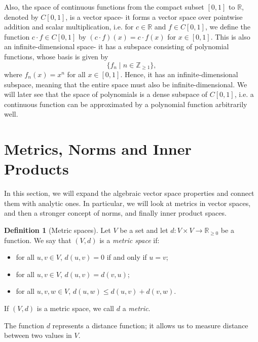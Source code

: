 \documentclass[a4paper, openany]{memoir}
\theoremstyle{definition}
\newtheorem{definition}{Definition}[section]
\theoremstyle{plain}
\begin{document}
    Also, the space of continuous functions from the compact subset $[0, 1]$ to $\mathbb{R}$, denoted by $C[0, 1]$, is a vector space- it forms a vector space over pointwise addition and scalar multiplication, i.e. for $c \in \mathbb{R}$ and $f \in C[0, 1]$, we define the function $c \cdot f \in C[0, 1]$ by $(c \cdot f)(x) = c \cdot f(x)$    for $x \in [0, 1]$. This is also an infinite-dimensional space- it has a subspace consisting of polynomial functions, whose basis is given by
    \[\{f_n \mid n \in \mathbb{Z}_{\geq 1}\},\]
    where $f_n(x) = x^n$ for all $x \in [0, 1]$. Hence, it has an infinite-dimensional subspace, meaning that the entire space must also be infinite-dimensional. We will later see that the space of polynomials is a dense subspace of $C[0, 1]$, i.e. a continuous function can be approximated by a polynomial function arbitrarily well.
    \newpage

    \section{Metrics, Norms and Inner Products}
    In this section, we will expand the algebraic vector space properties and connect them with analytic ones. In particular, we will look at metrics in vector spaces, and then a stronger concept of norms, and finally inner product spaces.

    \begin{definition}[Metric spaces]
        Let $V$ be a set and let $d \colon V \times V \to \mathbb{R}_{\geq 0}$ be a function. We say that $(V, d)$ is a \emph{metric space} if:
        \begin{itemize}
            \item for all $u, v \in V$, $d(u, v) = 0$ if and only if $u = v$;
            \item for all $u, v \in V$, $d(u, v) = d(v, u)$;
            \item for all $u, v, w \in V$, $d(u, w) \leq d(u, v) + d(v, w)$.
        \end{itemize}
        If $(V, d)$ is a metric space, we call $d$ a \emph{metric}.
    \end{definition}
    \noindent The function $d$ represents a distance function; it allows us to measure distance between two values in $V$.
\end{document}
